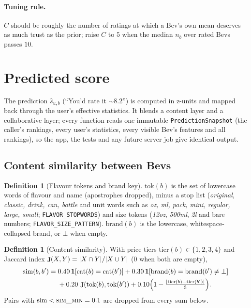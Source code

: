 \documentclass[11pt]{article}
\DeclarePairedDelimiter\abs{\lvert}{\rvert}
\DeclareMathOperator{\simi}{sim}
\DeclareMathOperator{\cat}{cat}
\DeclareMathOperator{\jac}{J}
\newcommand{\code}[1]{\texttt{#1}}
\newcommand{\ind}[1]{\mathbf{1}\!\left[#1\right]}
\newcommand{\shat}{\hat{s}}
\theoremstyle{plain}
\theoremstyle{definition}
\newtheorem{definition}[theorem]{Definition}
\theoremstyle{remark}
\begin{document}
\paragraph{Tuning rule.} $C$ should be roughly the number of ratings at which a Bev's own mean deserves as much trust as the prior; raise $C$ to $5$ when the median $n_b$ over rated Bevs passes $10$.

\section{Predicted score}\label{sec:predict}

The prediction $\shat_{u,b}$ (``You'd rate it $\sim$8.2'') is computed in z-units and mapped back through the user's effective statistics. It blends a content layer and a collaborative layer; every function reads one immutable \code{PredictionSnapshot} (the caller's rankings, every user's statistics, every visible Bev's features and all rankings), so the app, the tests and any future server job give identical output.

\subsection{Content similarity between Bevs}

\begin{definition}[Flavour tokens and brand key]
$\mathrm{tok}(b)$ is the set of lowercase words of flavour and name (apostrophes dropped), minus a stop list (\emph{original, classic, drink, can, bottle} and unit words such as \emph{oz, ml, pack, mini, regular, large, small}; \code{FLAVOR\_STOPWORDS}) and size tokens (\emph{12oz}, \emph{500ml}, \emph{2l} and bare numbers; \code{FLAVOR\_SIZE\_PATTERN}). $\mathrm{brand}(b)$ is the lowercase, whitespace-collapsed brand, or $\bot$ when empty.
\end{definition}

\begin{definition}[Content similarity]\label{def:sim}
With price tiers $\mathrm{tier}(b) \in \{1,2,3,4\}$ and Jaccard index $\jac(X, Y) = \abs{X \cap Y}/\abs{X \cup Y}$ ($0$ when both are empty),
\begin{equation}\label{eq:sim}
\begin{aligned}
\simi(b, b') ={}& 0.40\,\ind{\cat(b) = \cat(b')} + 0.30\,\ind{\mathrm{brand}(b) = \mathrm{brand}(b') \ne \bot} \\
&+ 0.20\,\jac(\mathrm{tok}(b), \mathrm{tok}(b')) + 0.10\Bigl(1 - \tfrac{\abs{\mathrm{tier}(b) - \mathrm{tier}(b')}}{3}\Bigr).
\end{aligned}
\end{equation}
Pairs with $\simi < \textsc{sim\_min} = 0.1$ are dropped from every sum below.
\end{definition}
\end{document}
